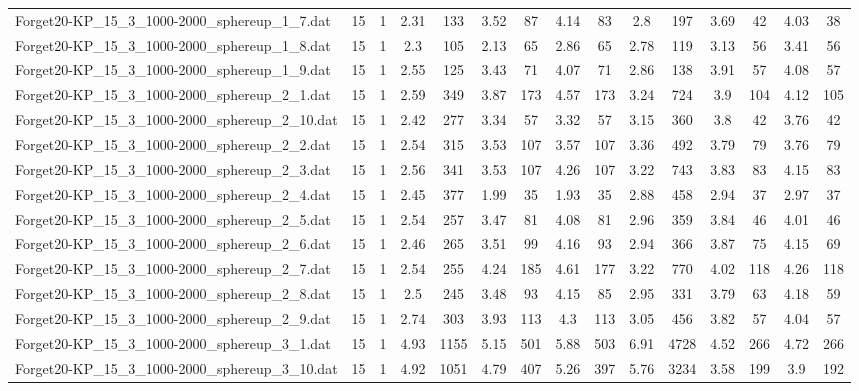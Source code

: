 \begin{table}[!ht]
{\begin{tabular}{lcccccccccccccc}
Forget20-KP\_15\_3\_1000-2000\_sphereup\_1\_7.dat & 15 & 1 & 2.31 & 133 & 3.52 & 87 & 4.14 & 83 & 2.8 & 197 & 3.69 & 42 & 4.03 & 38 \\
Forget20-KP\_15\_3\_1000-2000\_sphereup\_1\_8.dat & 15 & 1 & 2.3 & 105 & 2.13 & 65 & 2.86 & 65 & 2.78 & 119 & 3.13 & 56 & 3.41 & 56 \\
Forget20-KP\_15\_3\_1000-2000\_sphereup\_1\_9.dat & 15 & 1 & 2.55 & 125 & 3.43 & 71 & 4.07 & 71 & 2.86 & 138 & 3.91 & 57 & 4.08 & 57 \\
Forget20-KP\_15\_3\_1000-2000\_sphereup\_2\_1.dat & 15 & 1 & 2.59 & 349 & 3.87 & 173 & 4.57 & 173 & 3.24 & 724 & 3.9 & 104 & 4.12 & 105 \\
Forget20-KP\_15\_3\_1000-2000\_sphereup\_2\_10.dat & 15 & 1 & 2.42 & 277 & 3.34 & 57 & 3.32 & 57 & 3.15 & 360 & 3.8 & 42 & 3.76 & 42 \\
Forget20-KP\_15\_3\_1000-2000\_sphereup\_2\_2.dat & 15 & 1 & 2.54 & 315 & 3.53 & 107 & 3.57 & 107 & 3.36 & 492 & 3.79 & 79 & 3.76 & 79 \\
Forget20-KP\_15\_3\_1000-2000\_sphereup\_2\_3.dat & 15 & 1 & 2.56 & 341 & 3.53 & 107 & 4.26 & 107 & 3.22 & 743 & 3.83 & 83 & 4.15 & 83 \\
Forget20-KP\_15\_3\_1000-2000\_sphereup\_2\_4.dat & 15 & 1 & 2.45 & 377 & 1.99 & 35 & 1.93 & 35 & 2.88 & 458 & 2.94 & 37 & 2.97 & 37 \\
Forget20-KP\_15\_3\_1000-2000\_sphereup\_2\_5.dat & 15 & 1 & 2.54 & 257 & 3.47 & 81 & 4.08 & 81 & 2.96 & 359 & 3.84 & 46 & 4.01 & 46 \\
Forget20-KP\_15\_3\_1000-2000\_sphereup\_2\_6.dat & 15 & 1 & 2.46 & 265 & 3.51 & 99 & 4.16 & 93 & 2.94 & 366 & 3.87 & 75 & 4.15 & 69 \\
Forget20-KP\_15\_3\_1000-2000\_sphereup\_2\_7.dat & 15 & 1 & 2.54 & 255 & 4.24 & 185 & 4.61 & 177 & 3.22 & 770 & 4.02 & 118 & 4.26 & 118 \\
Forget20-KP\_15\_3\_1000-2000\_sphereup\_2\_8.dat & 15 & 1 & 2.5 & 245 & 3.48 & 93 & 4.15 & 85 & 2.95 & 331 & 3.79 & 63 & 4.18 & 59 \\
Forget20-KP\_15\_3\_1000-2000\_sphereup\_2\_9.dat & 15 & 1 & 2.74 & 303 & 3.93 & 113 & 4.3 & 113 & 3.05 & 456 & 3.82 & 57 & 4.04 & 57 \\
Forget20-KP\_15\_3\_1000-2000\_sphereup\_3\_1.dat & 15 & 1 & 4.93 & 1155 & 5.15 & 501 & 5.88 & 503 & 6.91 & 4728 & 4.52 & 266 & 4.72 & 266 \\
Forget20-KP\_15\_3\_1000-2000\_sphereup\_3\_10.dat & 15 & 1 & 4.92 & 1051 & 4.79 & 407 & 5.26 & 397 & 5.76 & 3234 & 3.58 & 199 & 3.9 & 192 \\

\end{tabular}}
\end{table}
